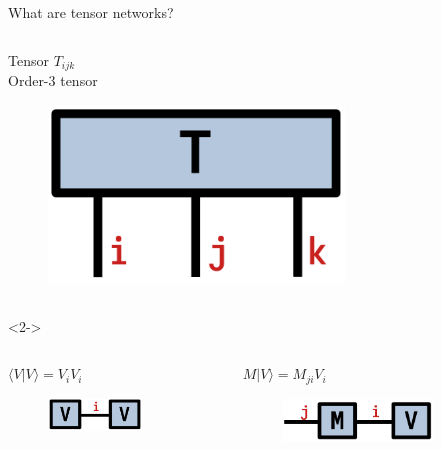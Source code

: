 \begin{frame}[fragile]{What are tensor networks?}
\begin{columns}
  \begin{column}[T]{0.33\textwidth}
    \centering
    Tensor $T_{ijk}$ \\
    Order-3 tensor
    \begin{figure}[T]
      \includegraphics[width=0.7\textwidth]{
        slides/assets/T.png
      }
    \end{figure}
  \end{column}

\end{columns}

\vspace*{0.4cm}

\begin{onlyenv}<2->

\begin{columns}

  \begin{column}[T]{0.33\textwidth}
    \centering
    $\langle V|V\rangle = V_i V_i$
    \begin{figure}[T]
      \includegraphics[width=0.7\textwidth]{
        slides/assets/VV.png
      }
    \end{figure}
  \end{column}

  \begin{column}[T]{0.33\textwidth}
    \centering
    $M|V\rangle = M_{ji} V_i$
    \begin{figure}[T]
      \includegraphics[width=0.8\textwidth]{
        slides/assets/MV.png
      }
    \end{figure}
  \end{column}


\end{columns}
\end{onlyenv}
\end{frame}
